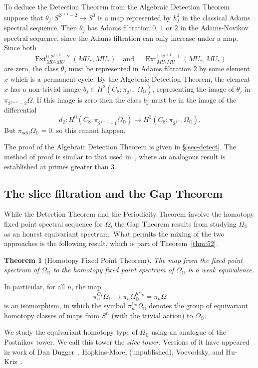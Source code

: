 \documentclass{amsart}
\newtheorem{thm}[equation]{Theorem}
\theoremstyle{definition}
\theoremstyle{remark}
\newcommand{\ext}{\operatorname{Ext}}
\newcommand{\ze}{C_{8}}
\newcommand{\magic}{\Omega}
\newcommand{\premagic}{\Omega_{\mathbb{O}}}
\begin{document}
To deduce the Detection Theorem from the Algebraic Detection Theorem
suppose that $\theta_{j}:S^{2^{j+1}-2}\to S^{0}$ is a map represented
by $h_{j}^{2}$ in the classical Adams spectral sequence.  Then
$\theta_{j}$ has Adams filtration $0$, $1$ or $2$ in the Adams-Novikov
spectral sequence, since the Adams filtration can only increase under
a map.  Since both
\[
\ext^{0,2^{j+1}-2}_{MU_{\ast}MU}\left(MU_{*}, MU_{*}\right)\quad\text{
and }\quad\ext^{{1,2^{j+1}-1}}_{MU_{\ast}MU}\left(MU_{*},
MU_{*}\right) 
\]
are zero, the class $\theta_{j}$ must be represented in Adams
filtration $2$ by some element $x$ which is a permanent cycle.  By the
Algebraic Detection Theorem, the element $x$ has a non-trivial image
$b_{j}\in H^{2}(\ze;\pi_{2^{j+1}}\premagic)$, representing the
image of $\theta_{j}$ in $\pi_{2^{j+1}-2}\magic$.  If this 
image is zero then the class $b_{j}$ must be in the image of the 
differential
\[
d_{2}:H^{0}(\ze;\pi_{2^{j+1}-1}\premagic) \to 
H^{2}(\ze;\pi_{2^{j+1}}\premagic).
\]
But $\pi_{\text{odd}}\premagic=0$, so this cannot happen.

The proof of the Algebraic Detection Theorem is given in
\S\ref{sec-detect}.  The method of proof is similar to that used
in~\cite{Rav:Arf}, where an analogous result is established at primes
greater than $3$.

\subsection{The slice filtration and the Gap Theorem}

While the Detection Theorem and the Periodicity Theorem involve the
homotopy fixed point spectral sequence for $\magic$, the Gap Theorem
results from studying $\premagic$ as an honest equivariant spectrum.
What permits the mixing of the two approaches is the following result,
which is part of Theorem~\ref{thm:52}.

\begin{thm}[Homotopy Fixed Point Theorem] The map from the fixed point
spectrum of $\premagic$ to the homotopy fixed point spectrum of
$\premagic$ is a weak equivalence.
\end{thm}

In particular, for all $n$, the map
\[
\pi_{n}^{\ze}\premagic\to \pi_{n}\premagic^{h\ze}=\pi_{n}\magic
\]
is an isomorphism, in which the symbol $\pi_{n}^{\ze}\premagic$
denotes the group of equivariant homotopy classes of maps from $S^{n}$
(with the trivial action) to $\premagic$.

We study the equivariant homotopy type of $\premagic$ using an
analogue of the Postnikov tower.  We call this tower the {\em slice
tower}.  Versions of it have appeared in work of Dan
Dugger~\cite{MR2240234}, Hopkins-Morel (unpublished),
Voevodsky\cite{MR2101286,MR1977582,MR1890744}, and
Hu-Kriz~\cite{MR1808224}.   
\end{document}
